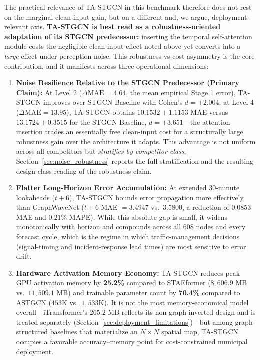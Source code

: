 \documentclass[preprint,12pt]{elsarticle}
\begin{document}
The practical relevance of TA-STGCN in this benchmark therefore does not rest on the marginal clean-input gain, but on a different and, we argue, deployment-relevant axis. \textbf{TA-STGCN is best read as a robustness-oriented adaptation of its STGCN predecessor:} inserting the temporal self-attention module costs the negligible clean-input effect noted above yet converts into a \emph{large} effect under perception noise. This robustness-vs-cost asymmetry is the core contribution, and it manifests across three operational dimensions:
\begin{enumerate}
    \item \textbf{Noise Resilience Relative to the STGCN Predecessor (Primary Claim):} At Level 2 ($\Delta\text{MAE}=4.64$, the mean empirical Stage 1 error), TA-STGCN improves over STGCN Baseline with Cohen's $d = +2.004$; at Level 4 ($\Delta \text{MAE} = 13.95$), TA-STGCN obtains $10.1532 \pm 1.1153$ MAE versus $13.1724 \pm 0.3515$ for the STGCN Baseline, $d = +3.651$---the attention insertion trades an essentially free clean-input cost for a structurally large robustness gain over the architecture it adapts. This advantage is not uniform across all competitors but \emph{stratifies by competitor class}; Section~\ref{sec:noise_robustness} reports the full stratification and the resulting design-class reading of the robustness claim.
    \item \textbf{Flatter Long-Horizon Error Accumulation:} At extended 30-minute lookaheads ($t+6$), TA-STGCN bounds error propagation more effectively than GraphWaveNet ($t+6$ MAE $= 3.4947$ vs.\ $3.5800$, a reduction of $0.0853$ MAE and $0.21\%$ MAPE). While this absolute gap is small, it widens monotonically with horizon and compounds across all $608$ nodes and every forecast cycle, which is the regime in which traffic-management decisions (signal-timing and incident-response lead times) are most sensitive to error drift.
    \item \textbf{Hardware Activation Memory Economy:} TA-STGCN reduces peak GPU activation memory by \textbf{25.2\%} compared to STAEformer ($8,606.9$ MB vs.\ $11,509.1$ MB) and trainable parameter count by \textbf{70.4\%} compared to ASTGCN ($453\text{K}$ vs.\ $1,533\text{K}$). It is not the most memory-economical model overall---iTransformer's $265.2$ MB reflects its non-graph inverted design and is treated separately (Section~\ref{sec:deployment_limitations})---but among graph-structured baselines that materialize an $N\times N$ spatial map, TA-STGCN occupies a favorable accuracy--memory point for cost-constrained municipal deployment.
\end{enumerate}
\end{document}
